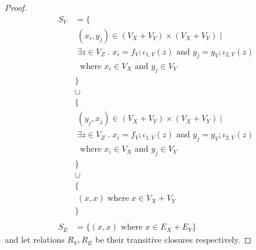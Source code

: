 \begin{proof}
    \else 
    \begin{align*}    
    S_{V} &= \{\\
          &\;(x_i,y_j) \in (V_{X} + V_{Y}) \times (V_{X} + V_{Y})\; | \\
          &\;\exists z \in V_{Z} \; . \; x_i = f_{V};\iota_{1,V}(z) \text{ and } y_j = g_{V};\iota_{2,V}(z)\\
          &\;\text{ where $x_i \in V_{X}$ and $y_j \in V_{Y}$ }\\
          &\}\\
          &\cup\\
          &\{\\
          &\;(y_j,x_j) \in (V_{X} + V_{Y}) \times (V_{X} + V_{Y})\; | \\
          &\;\exists z \in V_{Z} \; . \; x_i = f_{V};\iota_{1,V}(z) \text{ and } y_j = g_{V};\iota_{2,V}(z)\\
          &\;\text{ where $x_i \in V_{X}$ and $y_j \in V_{Y}$ }\\
          &\}\\
          &\cup\\
          &\{\\
          &\;(x,x)\;\text{where}\; x \in V_{X} + V_{Y}\\
          &\}\\
        \\
    S_{E} &= \{(x,x) \text{ where } x \in E_{X} + E_{Y}\}
    \end{align*}
    \fi
and let relations $R_{V},R_{E}$ be their transitive closures respectively.



\end{proof}
